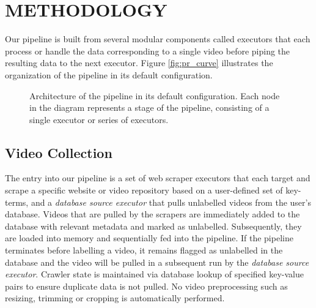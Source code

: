 \documentclass[letterpaper, 10 pt, conference]{ieeeconf}
\begin{document}
\section{METHODOLOGY}

Our pipeline is built from several modular components called executors that each process or handle the data corresponding to a single video before piping the resulting data to the next executor. Figure \ref{fig:pr_curve} illustrates the organization of the pipeline in its default configuration.

\begin{figure}[htbp]
	\centering
		\caption{Architecture of the pipeline in its default configuration. Each node in the diagram represents a stage of the pipeline, consisting of a single executor or series of executors.}
		\label{fig:pipeline-architecture}
\end{figure}

\subsection{Video Collection}

The entry into our pipeline is a set of web scraper executors that each target and scrape a specific website or video repository based on a user-defined set of key-terms, and a \textit{database source executor} that pulls unlabelled videos from the user's database. Videos that are pulled by the scrapers are immediately added to the database with relevant metadata and marked as unlabelled. Subsequently, they are loaded into memory and sequentially fed into the pipeline. If the pipeline terminates before labelling a video, it remains flagged as unlabelled in the database and the video will be pulled in a subsequent run by the \textit{database source executor}. Crawler state is maintained via database lookup of specified key-value pairs to ensure duplicate data is not pulled. No video preprocessing such as resizing, trimming or cropping is automatically performed.
\end{document}
